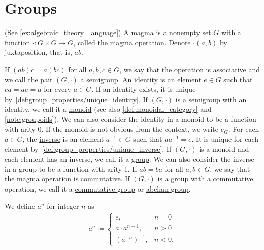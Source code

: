 \section{Groups}\label{sec:groups}

\begin{definition}\label{def:group}(See \cref{ex:algebraic_theory_language})
  A \uline{magma} is a nonempty set $G$ with a function $\cdot: G \times G \to G$, called the \uline{magma operation}. Denote $\cdot(a, b)$ by juxtaposition, that is, $ab$.

  \begin{description}
     If $(ab)c = a(bc)$ for all $a, b, c \in G$, we say that the operation is \uline{associative} and we call the pair $(G, \cdot)$ a \uline{semigroup}.
     An \uline{identity} is an element $e \in G$ such that $ea = ae = a$ for every $a \in G$. If an identity exists, it is unique by~\cref{def:group_properties/unique_identity}. If $(G, \cdot)$ is a semigroup with an identity, we call it a \uline{monoid} (see also \cref{def:monoidal_category} and \cref{note:groupoids}). We can also consider the identity in a monoid to be a function with arity 0. If the monoid is not obvious from the context, we write $e_G$.
     For each $a \in G$, the \uline{inverse} is an element $a^{-1} \in G$ such that $aa^{-1} = e$. It is unique for each element by~\cref{def:group_properties/unique_inverse}. If $(G, \cdot)$ is a monoid and each element has an inverse, we call it a \uline{group}. We can also consider the inverse in a group to be a function with arity 1.
     If $ab = ba$ for all $a, b \in G$, we say that the magma operation is \uline{commutative}. If $(G, \cdot)$ is a group with a commutative operation, we call it a \uline{commutative group} or \uline{abelian group}.
  \end{description}

  We define $a^n$ for integer $n$ as
  \begin{align*}
    a^n \coloneqq \begin{cases}
      e, &n = 0 \\
      a \cdot a^{n-1}, &n > 0 \\
      (a^{-n})^{-1}, &n < 0.
    \end{cases}
  \end{align*}


\end{definition}
